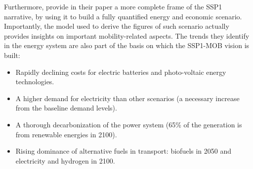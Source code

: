 Furthermore, \textcite{vuuren2017_Energylanduse} provide in their paper a more complete frame of the SSP1 narrative, by using it to build a fully quantified energy and economic scenario. Importantly, the model used to derive the figures of such scenario actually provides insights on important mobility-related aspects. The trends they identify in the energy system are also part of the basis on which the SSP1-MOB vision is built:
%
\begin{itemize}
\item Rapidly declining costs for electric batteries and photo-voltaic energy technologies.
\item A higher demand for electricity than other scenarios (a necessary increase from the baseline demand levels).
\item A thorough decarbonization of the power system (65\% of the generation is from renewable energies in 2100).
\item Rising dominance of alternative fuels in transport: biofuels in 2050 and electricity and hydrogen in 2100.
\end{itemize}

